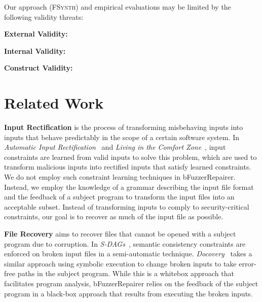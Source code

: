 \documentclass[sigconf,review,anonymous]{acmart}
\newcounter{todocounter}
\newcommand{\todo}[1]{\marginpar{$|$}\textcolor{red}{\stepcounter{todocounter}\footnote[\thetodocounter]{\textcolor{red}{\textbf{TODO }}\textit{#1}}}}
\renewcommand{\todo}[1]{}
\newcommand{\approach}{\textsc{FSynth}\xspace}
\def\bfr{bFuzzerRepairer\xspace}
\begin{document}
\todo{discuss threats to validity .... discuss issues like input synthesis (insertion), requires rich feedback: incorrect and incomplete input fragment}
Our approach (\approach) and empirical evaluations may be limited by the following validity threats:

\noindent
\textbf{External Validity:}

\noindent
\textbf{Internal Validity:}


\noindent
\textbf{Construct Validity:}


\section{Related Work}
\label{sec:related_work}

\todo{refactor this section, looks to similar to ddmax, also add Infix paper ... }


\noindent
\textbf{Input Rectification} is the process of transforming misbehaving inputs into inputs that behave predictably in the scope of a certain software system.
    In \textit{Automatic Input Rectification}~\cite{Long:2012:AIR:2337223.2337233} and \emph{Living in the Comfort Zone}~\cite{Rinard:2007:LCZ:1297027.1297072}, input constraints are learned from valid inputs to solve this problem, which are used to transform malicious inputs into rectified inputs that satisfy learned constraints.
    We do not employ such constraint learning techniques in \bfr.
    Instead, we employ the knowledge of a grammar describing the input file format and the feedback of a subject program to transform the input files into an acceptable subset.
    Instead of transforming inputs to comply to security-critical constraints, our goal is to recover as much of the input file as possible.

\noindent
\textbf{File Recovery} aims to recover files that cannot be opened with a subject program due to corruption.
In \emph{S-DAGs}~\cite{scheffczyk2004s}, semantic consistency constraints are enforced on broken input files in a semi-automatic technique.
\emph{Docovery}~\cite{docovery:ase14} takes a similar approach using symbolic execution to change broken inputs to take error-free paths in the subject program.
While this is a whitebox approach that facilitates program analysis, \bfr relies on the feedback of the subject program in a black-box approach that results from executing the broken inputs.
\end{document}
